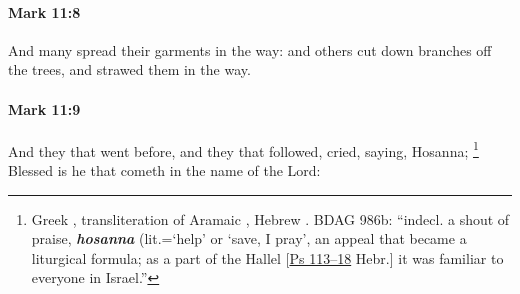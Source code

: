 		\paragraph{Mark 11:8} %
			\label{MARK-11-8}

			And many spread their garments in the way: and others cut down branches off the trees, and strawed them in the way.

			\begin{framed}
			\scriptsize
				\begin{compactdesc}
					\item[SBLG] 
				\end{compactdesc}
			\end{framed}

		\paragraph{Mark 11:9} %
			\label{MARK-11-9}

			And they that went before, and they that followed, cried, saying, Hosanna;%
				\footnote{%
					Greek , transliteration of Aramaic , Hebrew . BDAG 986b: ``indecl. a shout of praise, \textbf{\textit{hosanna}} (lit.=`help' or `save, I pray', an appeal that became a liturgical formula; as a part of the Hallel [\hyperref[PSALMS-113]{Ps 113--18} Hebr.] it was familiar to everyone in Israel.''
					}
			Blessed is he that cometh in the name of the Lord:

